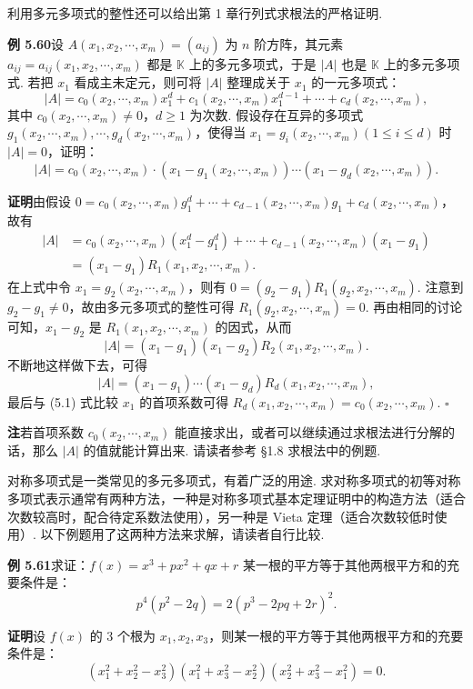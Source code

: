 \documentclass[UTF8, 12pt, fontset=fandol, oneside]{ctexart}
\begin{document}
利用多元多项式的整性还可以给出第 1 章行列式求根法的严格证明.

\noindent\textbf{例 5.60}\quad 设 $A(x_1,x_2,\cdots,x_m)=(a_{ij})$ 为 $n$ 阶方阵，其元素 $a_{ij}=a_{ij}(x_1,x_2,\cdots,x_m)$ 都是 $\mathbb{K}$ 上的多元多项式，于是 $|A|$ 也是 $\mathbb{K}$ 上的多元多项式. 若把 $x_1$ 看成主未定元，则可将 $|A|$ 整理成关于 $x_1$ 的一元多项式：
\begin{equation}
|A|=c_0(x_2,\cdots,x_m)x_1^d+c_1(x_2,\cdots,x_m)x_1^{d-1}+\cdots+c_d(x_2,\cdots,x_m),
\tag{5.1}
\end{equation}
其中 $c_0(x_2,\cdots,x_m)\ne0$，$d\ge1$ 为次数. 假设存在互异的多项式 $g_1(x_2,\cdots,x_m),\cdots,g_d(x_2,\cdots,x_m)$，使得当 $x_1=g_i(x_2,\cdots,x_m)(1\le i\le d)$ 时 $|A|=0$，证明：
\[
|A|=c_0(x_2,\cdots,x_m)\cdot (x_1-g_1(x_2,\cdots,x_m))\cdots (x_1-g_d(x_2,\cdots,x_m)).
\]

\noindent\textbf{证明}\quad 由假设 $0=c_0(x_2,\cdots,x_m)g_1^d+\cdots+c_{d-1}(x_2,\cdots,x_m)g_1+c_d(x_2,\cdots,x_m)$，故有
\[
\begin{aligned}
|A|
&=c_0(x_2,\cdots,x_m)(x_1^d-g_1^d)+\cdots+c_{d-1}(x_2,\cdots,x_m)(x_1-g_1)\\
&=(x_1-g_1)R_1(x_1,x_2,\cdots,x_m).
\end{aligned}
\]
在上式中令 $x_1=g_2(x_2,\cdots,x_m)$，则有 $0=(g_2-g_1)R_1(g_2,x_2,\cdots,x_m)$. 注意到 $g_2-g_1\ne0$，故由多元多项式的整性可得 $R_1(g_2,x_2,\cdots,x_m)=0$. 再由相同的讨论可知，$x_1-g_2$ 是 $R_1(x_1,x_2,\cdots,x_m)$ 的因式，从而
\[
|A|=(x_1-g_1)(x_1-g_2)R_2(x_1,x_2,\cdots,x_m).
\]
不断地这样做下去，可得
\[
|A|=(x_1-g_1)\cdots(x_1-g_d)R_d(x_1,x_2,\cdots,x_m),
\]
最后与 (5.1) 式比较 $x_1$ 的首项系数可得 $R_d(x_1,x_2,\cdots,x_m)=c_0(x_2,\cdots,x_m)$. \hfill $\square$

\noindent\textbf{注}\quad 若首项系数 $c_0(x_2,\cdots,x_m)$ 能直接求出，或者可以继续通过求根法进行分解的话，那么 $|A|$ 的值就能计算出来. 请读者参考 §1.8 求根法中的例题.

对称多项式是一类常见的多元多项式，有着广泛的用途. 求对称多项式的初等对称多项式表示通常有两种方法，一种是对称多项式基本定理证明中的构造方法（适合次数较高时，配合待定系数法使用），另一种是 Vieta 定理（适合次数较低时使用）. 以下例题用了这两种方法来求解，请读者自行比较.

\noindent\textbf{例 5.61}\quad 求证：$f(x)=x^3+px^2+qx+r$ 某一根的平方等于其他两根平方和的充要条件是：
\[
p^4(p^2-2q)=2(p^3-2pq+2r)^2.
\]

\noindent\textbf{证明}\quad 设 $f(x)$ 的 3 个根为 $x_1,x_2,x_3$，则某一根的平方等于其他两根平方和的充要条件是：
\[
(x_1^2+x_2^2-x_3^2)(x_1^2+x_3^2-x_2^2)(x_2^2+x_3^2-x_1^2)=0.
\]
\end{document}
